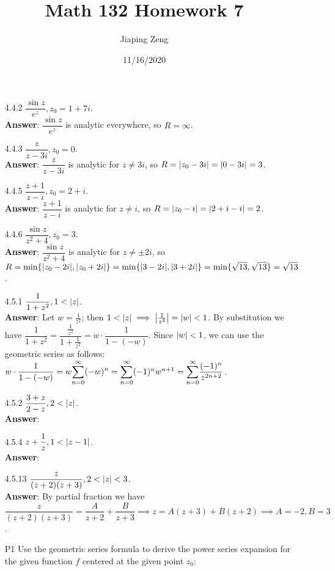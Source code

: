 \documentclass{article}
\title{Math 132 Homework 7}
\date{11/16/2020}
\author{Jiaping Zeng}
\begin{document}
\maketitle

\begin{itemize}
    \item [4.4.2] $\dfrac{\sin z}{e^z},z_0=1+7i$.\\
          \textbf{Answer}: $\dfrac{\sin z}{e^z}$ is analytic everywhere, so $R=\infty$.
    \item [4.4.3] $\dfrac{z}{z-3i},z_0=0$.\\
          \textbf{Answer}: $\dfrac{z}{z-3i}$ is analytic for $z\neq 3i$, so $R=\abs{z_0-3i}=\abs{0-3i}=3$.
    \item [4.4.5] $\dfrac{z+1}{z-i},z_0=2+i$.\\
          \textbf{Answer}: $\dfrac{z+1}{z-i}$ is analytic for $z\neq i$, so $R=\abs{z_0-i}=\abs{2+i-i}=2$.
    \item [4.4.6] $\dfrac{\sin z}{z^2+4},z_0=3$.\\
          \textbf{Answer}: $\dfrac{\sin z}{z^2+4}$ is analytic for $z\neq\pm 2i$, so $R=\min\{\abs{z_0-2i},\abs{z_0+2i}\}=\min\{\abs{3-2i},\abs{3+2i}\}=\min\{\sqrt{13},\sqrt{13}\}=\sqrt{13}$.
    \item [4.5.1] $\dfrac{1}{1+z^2},1<\abs{z}$.\\
          \textbf{Answer}: Let $w=\frac{1}{z^2}$; then $1<\abs{z}\implies\abs{\frac{1}{z^2}}=\abs{w}<1$. By substitution we have $\dfrac{1}{1+z^2}=\dfrac{\frac{1}{z^2}}{1+\frac{1}{z^2}}=w\cdot\dfrac{1}{1-(-w)}$. Since $\abs{w}<1$, we can use the geometric series as follows: $w\cdot\dfrac{1}{1-(-w)}=w\mathlarger{\sum_{n=0}^\infty (-w)^n}=\mathlarger{\sum_{n=0}^\infty} (-1)^nw^{n+1}=\mathlarger{\sum_{n=0}^\infty}\dfrac{(-1)^n}{z^{2n+2}}$.
    \item [4.5.2] $\dfrac{3+z}{2-z},2<\abs{z}$.\\
          \textbf{Answer}: 
    \item [4.5.4] $z+\dfrac{1}{z},1<\abs{z-1}$.\\
          \textbf{Answer}:
    \item [4.5.13] $\dfrac{z}{(z+2)(z+3)},2<\abs{z}<3$.\\
          \textbf{Answer}: By partial fraction we have $\dfrac{z}{(z+2)(z+3)}=\dfrac{A}{z+2}+\dfrac{B}{z+3}\implies z=A(z+3)+B(z+2)\implies A=-2,B=3$.
    \item [P1] Use the geometric series formula to derive the power series expansion for the given function $f$ centered at the given point $z_0$:

\end{itemize}
\end{document}

